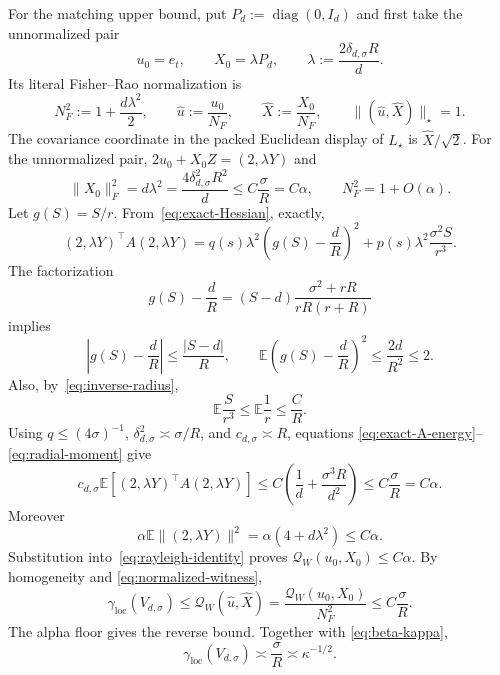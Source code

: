 \documentclass[11pt]{article}
\numberwithin{equation}{section}
\DeclareMathOperator{\diag}{diag}
\newcommand{\E}{\mathbb E}
\newcommand{\loc}{\mathrm{loc}}
\begin{document}
For the matching upper bound, put $P_d:=\diag(0,I_d)$ and first take the
unnormalized pair
\begin{equation}\label{eq:witness}
 u_0=e_t,\qquad
 X_0=\lambda P_d,\qquad
 \lambda:=\frac{2\delta_{d,\sigma}R}{d}.
\end{equation}
Its literal Fisher--Rao normalization is
\begin{equation}\label{eq:normalized-witness}
 N_F^2:=1+\frac{d\lambda^2}{2},\qquad
 \widehat u:=\frac{u_0}{N_F},\qquad
 \widehat X:=\frac{X_0}{N_F},\qquad
 \|(\widehat u,\widehat X)\|_\star=1.
\end{equation}
The covariance coordinate in the packed Euclidean display of $L_\star$ is
$\widehat X/\sqrt2$.  For the unnormalized pair,
$2u_0+X_0Z=(2,\lambda Y)$ and
\begin{equation}\label{eq:X-cost}
 \|X_0\|_F^2=d\lambda^2
 =\frac{4\delta_{d,\sigma}^2R^2}{d}\le C\frac\sigma R=C\alpha,
 \qquad N_F^2=1+O(\alpha).
\end{equation}
Let $g(S)=S/r$.  From~\eqref{eq:exact-Hessian}, exactly,
\begin{equation}\label{eq:exact-A-energy}
 (2,\lambda Y)^\top A(2,\lambda Y)
 =q(s)\lambda^2\left(g(S)-\frac dR\right)^2
 +p(s)\lambda^2\frac{\sigma^2S}{r^3}.
\end{equation}
The factorization
\begin{equation}\label{eq:residual-factorization}
 g(S)-\frac dR
 =(S-d)\frac{\sigma^2+rR}{rR(r+R)}
\end{equation}
implies
\begin{equation}\label{eq:residual-moment}
 \left|g(S)-\frac dR\right|\le\frac{|S-d|}{R},\qquad
 \E\left(g(S)-\frac dR\right)^2\le\frac{2d}{R^2}\le2.
\end{equation}
Also, by~\eqref{eq:inverse-radius},
\begin{equation}\label{eq:radial-moment}
 \E\frac S{r^3}\le\E\frac1r\le\frac C R.
\end{equation}
Using $q\le(4\sigma)^{-1}$,
$\delta_{d,\sigma}^2\asymp\sigma/R$, and
$c_{d,\sigma}\asymp R$, equations
\eqref{eq:exact-A-energy}--\eqref{eq:radial-moment} give
\begin{equation}\label{eq:scaled-A-energy}
 c_{d,\sigma}\E[(2,\lambda Y)^\top A(2,\lambda Y)]
 \le C\left(\frac1d+\frac{\sigma^3R}{d^2}\right)
 \le C\frac\sigma R=C\alpha.
\end{equation}
Moreover
\begin{equation}\label{eq:floor-energy}
 \alpha\E\|(2,\lambda Y)\|^2=\alpha(4+d\lambda^2)\le C\alpha.
\end{equation}
Substitution into~\eqref{eq:rayleigh-identity} proves
$\mathcal Q_W(u_0,X_0)\le C\alpha$.  By homogeneity and
\eqref{eq:normalized-witness},
\begin{equation}\label{eq:gap-frontier}
 \gamma_{\loc}(V_{d,\sigma})
 \le\mathcal Q_W(\widehat u,\widehat X)
 =\frac{\mathcal Q_W(u_0,X_0)}{N_F^2}
 \le C\frac\sigma R.
\end{equation}
The alpha floor gives the reverse bound.  Together with
\eqref{eq:beta-kappa},
\begin{equation}\label{eq:gap-exact-frontier}
 \gamma_{\loc}(V_{d,\sigma})\asymp\frac\sigma R
 \asymp\kappa^{-1/2}.
\end{equation}
\end{document}
